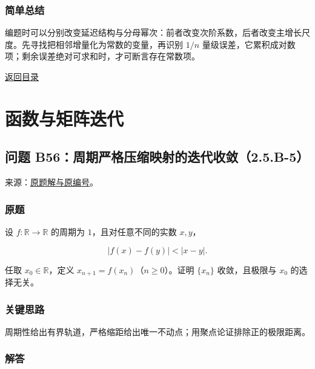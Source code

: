 \documentclass[11pt,a4paper]{article}
\begin{document}
\subsubsection{简单总结}\label{ux7b80ux5355ux603bux7ed3-10}

编题时可以分别改变延迟结构与分母幂次：前者改变次阶系数，后者改变主增长尺度。先寻找把相邻增量化为常数的变量，再识别
\(1/n\)
量级误差，它累积成对数项；剩余误差绝对可求和时，才可断言存在常数项。

\noindent\hyperref[contents]{返回目录}

\clearpage

\section{函数与矩阵迭代}\label{ux51fdux6570ux4e0eux77e9ux9635ux8fedux4ee3}

\subsection{问题
B56：周期严格压缩映射的迭代收敛（2.5.B-5）}\label{ux95eeux9898-b56ux5468ux671fux4e25ux683cux538bux7f29ux6620ux5c04ux7684ux8fedux4ee3ux6536ux655b2.5.b-5}

来源：\href{https://zj139.github.io/math-notes/problems/6e82c6e274a8f219f40720c7/\#问题-b56}{原题解与原编号}。

\subsubsection{原题}\label{ux539fux9898-11}

设 \(f:\mathbb R\to\mathbb R\) 的周期为 \(1\)，且对任意不同的实数
\(x,y\)，

\[
|f(x)-f(y)|<|x-y|.
\]

任取 \(x_0\in\mathbb R\)，定义 \(x_{n+1}=f(x_n)\)（\(n\ge0\)）。证明
\(\{x_n\}\) 收敛，且极限与 \(x_0\) 的选择无关。

\subsubsection{关键思路}\label{ux5173ux952eux601dux8def-11}

周期性给出有界轨道，严格缩距给出唯一不动点；用聚点论证排除正的极限距离。

\subsubsection{解答}\label{ux89e3ux7b54-11}
\end{document}
